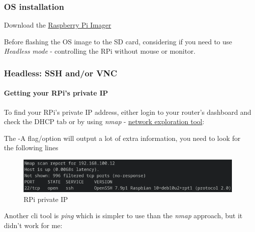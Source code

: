 \hypertarget{os-installation}{%
\subsubsection{OS installation}\label{os-installation}}

Download the \href{https://www.raspberrypi.com/software/}{Raspberry Pi
Imager}

Before flashing the OS image to the SD card, considering if you need to
use \emph{Headless mode} - controlling the RPi without mouse or monitor.

\hypertarget{headless-ssh-andor-vnc}{%
\subsubsection{Headless: SSH and/or VNC}\label{headless-ssh-andor-vnc}}

\hypertarget{getting-your-rpis-private-ip}{%
\paragraph{Getting your RPi's private
IP}\label{getting-your-rpis-private-ip}}

To find your RPi's private IP address, either login to your router's
dashboard and check the DHCP tab or by using \emph{nmap} -
\href{https://manpages.ubuntu.com/manpages/bionic/en/man1/nmap.1.html}{network
exploration tool}:

\begin{Shaded}
\begin{Highlighting}[]
\ExtensionTok{$} \OperatorTok{\textless{}}\OperatorTok{\textgreater{}}
\end{Highlighting}
\end{Shaded}

The -A flag/option will output a lot of extra information, you need to
look for the following lines

\begin{figure}
\centering
\includegraphics{./media/RPi_ip.png}
\caption{RPi private IP}
\end{figure}

Another cli tool is \emph{ping} which is simpler to use than the
\emph{nmap} approach, but it didn't work for me:

